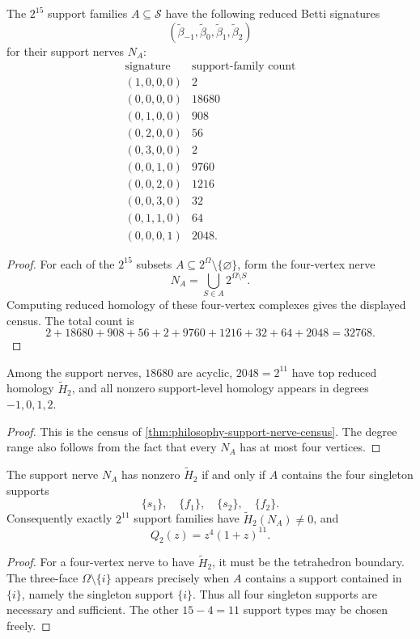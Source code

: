 \begin{theorem}
\label{thm:philosophy-support-nerve-census}
The $2^{15}$ support families $A\subseteq\mathcal{S}$ have the
following reduced Betti signatures
$$
  (\widetilde{\beta}_{-1},\widetilde{\beta}_{0},
  \widetilde{\beta}_{1},\widetilde{\beta}_{2})
$$
for their support nerves $N_{A}$:
$$
\begin{array}{c|r}
  \text{signature} & \text{support-family count}\\
  \hline
  (1,0,0,0) & 2\\
  (0,0,0,0) & 18680\\
  (0,1,0,0) & 908\\
  (0,2,0,0) & 56\\
  (0,3,0,0) & 2\\
  (0,0,1,0) & 9760\\
  (0,0,2,0) & 1216\\
  (0,0,3,0) & 32\\
  (0,1,1,0) & 64\\
  (0,0,0,1) & 2048.
\end{array}
$$
\end{theorem}
\begin{proof}
For each of the $2^{15}$ subsets
$A\subseteq2^{\Omega}\setminus\{\varnothing\}$, form the four-vertex
nerve
$$
  N_{A}=\bigcup_{S\in A}2^{\Omega\setminus S}.
$$
Computing reduced homology of these four-vertex complexes gives the
displayed census. The total count is
$$
  2+18680+908+56+2+9760+1216+32+64+2048=32768.
$$
\end{proof}

\begin{corollary}
\label{cor:philosophy-support-level-homology-distribution}
Among the support nerves, $18680$ are acyclic, $2048=2^{11}$ have
top reduced homology $\widetilde{H}_{2}$, and all nonzero support-level
homology appears in degrees $-1,0,1,2$.
\end{corollary}
\begin{proof}
This is the census of
\autoref{thm:philosophy-support-nerve-census}. The degree range also
follows from the fact that every $N_{A}$ has at most four vertices.
\end{proof}

\begin{theorem}
\label{thm:philosophy-top-support-nerve-criterion}
The support nerve $N_{A}$ has nonzero $\widetilde{H}_{2}$ if and only
if $A$ contains the four singleton supports
$$
  \{s_{1}\},\quad \{f_{1}\},\quad \{s_{2}\},\quad \{f_{2}\}.
$$
Consequently exactly $2^{11}$ support families have
$\widetilde{H}_{2}(N_{A})\neq0$, and
$$
  Q_{2}(z)=z^{4}(1+z)^{11}.
$$
\end{theorem}
\begin{proof}
For a four-vertex nerve to have $\widetilde{H}_{2}$, it must be the
tetrahedron boundary. The three-face $\Omega\setminus\{i\}$ appears
precisely when $A$ contains a support contained in $\{i\}$, namely the
singleton support $\{i\}$. Thus all four singleton supports are
necessary and sufficient. The other $15-4=11$ support types may be
chosen freely.
\end{proof}

